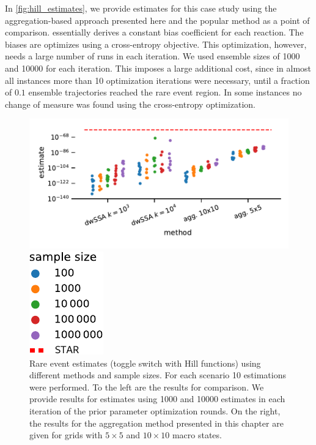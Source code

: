 In \autoref{fig:hill_estimates}, we provide estimates for this case study using the aggregation-based approach presented here and the popular  method as a point of comparison.
 \parencite{daigle2011automated} essentially derives a constant bias coefficient for each reaction.
The biases are optimizes using a cross-entropy objective.
This optimization, however, needs a large number of runs in each iteration.
We used ensemble sizes of \num{1000} and \num{10000} for each iteration.
This imposes a large additional cost, since in almost all instances more than \num{10} optimization iterations were necessary, until a fraction of $0.1$ ensemble trajectories reached the rare event region.
In some instances no change of measure was found using the cross-entropy optimization.
\begin{figure}[htb]
    \centering
    \begin{minipage}{0.77\textwidth}
        \includegraphics[scale=.55]{gfx/hill_estimates.pdf}
    \end{minipage}
    \hspace{1ex}
    \begin{minipage}{0.07\textwidth}
        \includegraphics[scale=.55]{gfx/hill_estimates_legend.pdf}
    \end{minipage}
    \caption[Rare event estimates (toggle switch)]{\label{fig:hill_estimates}Rare event estimates (toggle switch with Hill functions) using different methods and sample sizes. For each scenario \num{10} estimations were performed. To the left are the  results for comparison. We provide results for estimates using \num{1000} and \num{10000} estimates in each iteration of the prior parameter optimization rounds. On the right, the results for the aggregation method presented in this chapter are given for grids with $5\times 5$ and $10\times 10$ macro states.}
\end{figure}

